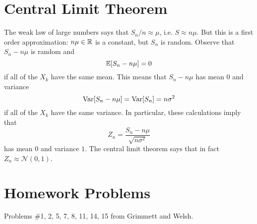 \section{Central Limit Theorem}

\begin{remark}
  The weak law of large numbers says that
  $S_n / n \approx \mu$, i.e.
  $S \approx n \mu$. But this is a first order
  approximation: $n \mu \in \mathbb{R}$ is a constant,
  but $S_n$ is random. Observe that
  $S_n - n\mu$ is random and
  \[
    \mathbb{E}[S_n - n\mu] = 0
  \]
  if all of the $X_k$ have the same mean.
  This means that $S_n - n\mu$ has
  mean $0$ and variance
  \[
    \operatorname{Var}[S_n - n\mu]
    = \operatorname{Var}[S_n] = n\sigma^2
  \]
  if all of the $X_k$ have the same variance.
  In particular, these calculations imply that
  \[
    Z_n = \frac{S_n - n\mu}{\sqrt{n\sigma^2}}
  \]
  has mean $0$ and variance $1$. The central
  limit theorem says that in fact
  $Z_n \approx \mathcal{N}(0, 1)$.
\end{remark}

\section{Homework Problems}
Problems \#1, 2, 5, 7, 8, 11, 14, 15
from Grimmett and Welsh.
